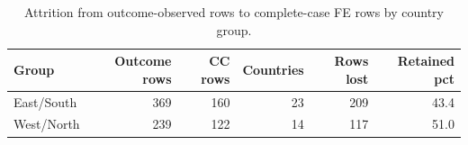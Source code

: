 \begin{table}[htbp]
\centering
\small
\caption{Attrition from outcome-observed rows to complete-case FE rows by country group.}
\label{tab:attrition_by_country_group}
\begin{tabular}{@{}lrrrrr@{}}
\toprule
Group & Outcome rows & CC rows & Countries & Rows lost & Retained pct \\
\midrule
East/South & 369 & 160 & 23 & 209 & 43.4 \\
West/North & 239 & 122 & 14 & 117 & 51.0 \\
\bottomrule
\end{tabular}
\end{table}

